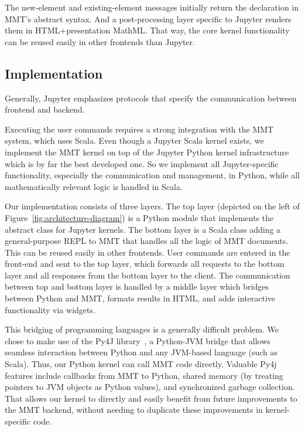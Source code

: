 The new-element and existing-element messages initially return the declaration in MMT's abstract syntax.
And a post-processing layer specific to Jupyter renders them in HTML+presentation MathML.
That way, the core kernel functionality can be reused easily in other frontends than Jupyter.

\subsection{Implementation}\label{sec:kernel:impl}

Generally, Jupyter emphasizes protocols that specify the communication between frontend and backend. 

Executing the user commands requires a strong integration with the MMT system, which uses Scala.
Even though a Jupyter Scala kernel exists, we implement the MMT kernel on top of the Jupyter Python kernel infrastructure which is by far the best developed one. 
So we implement all Jupyter-specific functionality, especially the communication and management, in Python, while all mathematically relevant logic is handled in Scala.

Our implementation consists of three layers.
The top layer (depicted on the left of Figure~\ref{fig:architecture-diagram}) is a Python module that implements the abstract class for Jupyter kernels.
The bottom layer is a Scala class adding a general-purpose REPL to MMT that handles all the logic of MMT documents.
This can be reused easily in other frontends.
User commands are entered in the front-end and sent to the top layer, which forwards all requests to the bottom layer and all responses from the bottom layer to the client.
The communication between top and bottom layer is handled by a middle layer which bridges between Python and MMT, formats results in HTML, and adds interactive functionality via widgets.


This bridging of programming languages is a generally difficult problem. 
We chose to make use of the Py4J library~\cite{Py4J:on}, a Python-JVM bridge that allows seamless interaction between Python and any JVM-based language (such as Scala).
Thus, our Python kernel can call MMT code directly.
Valuable Py4j features include callbacks from MMT to Python, shared memory (by treating pointers to JVM objects as Python values), and synchronized garbage collection.
That allows our kernel to directly and easily benefit from future improvements to the MMT backend, without needing to duplicate these improvements in kernel-specific code. 

